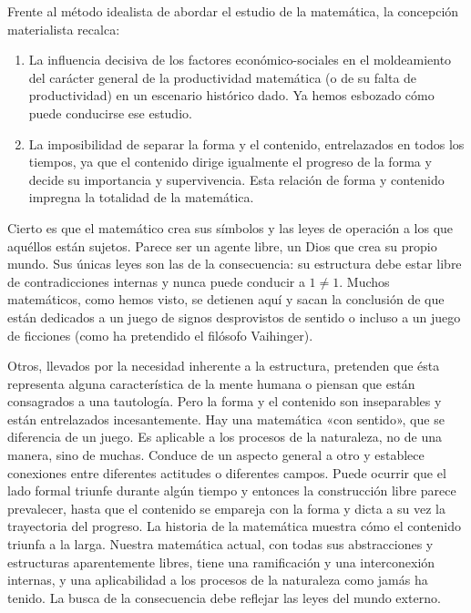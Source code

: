\documentclass[a4paper, 12pt]{article}
\begin{document}
{{Frente al método idealista de abordar el estudio de la matemática, la concepción
materialista recalca:

\begin{enumerate}

\item  La influencia decisiva de los factores económico-sociales en el
moldeamiento del carácter general de la productividad matemática (o de su falta
de productividad) en un escenario histórico dado. Ya hemos esbozado cómo puede
conducirse ese estudio.

\item  La imposibilidad de separar la forma y el contenido, entrelazados en
todos los tiempos, ya que el contenido dirige igualmente el progreso de la forma
y decide su importancia y supervivencia. Esta relación de forma y contenido
impregna la totalidad de la matemática.

\end{enumerate}

Cierto es que el matemático crea sus símbolos y las leyes de operación a los que
aquéllos están sujetos. Parece ser un agente libre, un Dios que crea su propio
mundo. Sus únicas leyes son las de la consecuencia: su estructura debe estar
libre de contradicciones internas y nunca puede conducir a \mbox{$1 \neq 1$.}
Muchos matemáticos, como hemos visto, se detienen aquí y sacan la conclusión de
que están dedicados a un juego de signos desprovistos de sentido o incluso a un
juego de ficciones (como ha pretendido el filósofo Vaihinger).

Otros, llevados por la necesidad inherente a la estructura, pretenden que ésta
representa alguna característica de la mente humana o piensan que están
consagrados a una tautología. Pero la forma y el contenido son inseparables y
están entrelazados incesantemente. Hay una matemática «con sentido», que se
diferencia de un juego. Es aplicable a los procesos de la naturaleza, no de una
manera, sino de muchas. Conduce de un aspecto general a otro y establece
conexiones entre diferentes actitudes o diferentes campos. Puede ocurrir que el
lado formal triunfe durante algún tiempo y entonces la construcción libre parece
prevalecer, hasta que el contenido se empareja con la forma y dicta a su vez la
trayectoria del progreso. La historia de la matemática muestra cómo el contenido
triunfa a la larga. Nuestra matemática actual, con todas sus abstracciones y
estructuras aparentemente libres, tiene una ramificación y una interconexión
internas, y una aplicabilidad a los procesos de la naturaleza como jamás ha
tenido. La busca de la consecuencia debe reflejar las leyes del mundo externo.

}}
\end{document}
